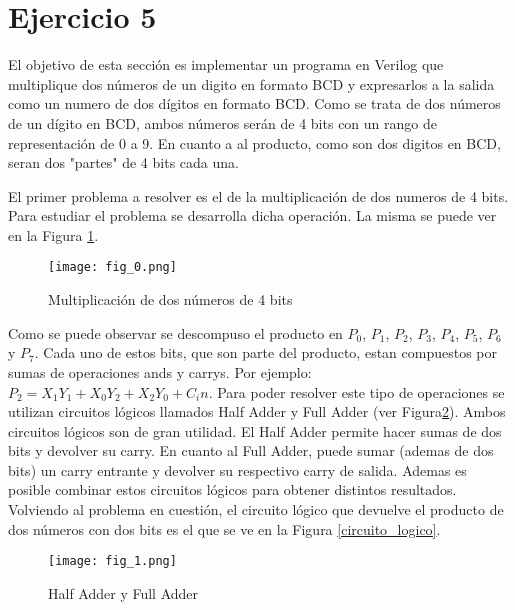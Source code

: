 \documentclass[12pt,a4paper]{article}
\begin{document}
\section{Ejercicio 5}


El objetivo de esta sección es implementar un programa en Verilog que multiplique dos números de un digito en formato BCD y expresarlos a la salida como un numero de dos dígitos en formato BCD. Como se trata
de dos números de un dígito en BCD, ambos números serán de 4 bits con un rango de representación de 0 a 9. En cuanto a al producto, como son dos digitos en BCD, seran dos "partes" de 4 bits cada una. 

El primer problema a resolver es el de la multiplicación de dos numeros de 4 bits. Para estudiar el problema se desarrolla dicha operación. La misma se puede ver en la Figura \ref{multiplicacion}. 


\begin{figure}[ht]                                                       
    \centering\texttt{[image: fig\_0.png]}
     \caption{Multiplicación de dos números de 4 bits}
     \label{multiplicacion}
     \end{figure}

Como se puede observar se descompuso el producto en $P_0$, $P_1$, $P_2$, $P_3$, $P_4$, $P_5$, $P_6$ y $P_7$. Cada uno de estos bits, que son parte del producto, estan compuestos por sumas de operaciones 
ands y carrys. Por ejemplo: $P_2 = X_1Y_1 + X_0Y_2 + X_2Y_0 + C_in$. Para poder resolver este tipo de operaciones se utilizan circuitos lógicos llamados Half Adder y Full Adder (ver Figura\ref{full_adder}). Ambos circuitos 
lógicos son de gran utilidad. El Half Adder permite hacer sumas de dos bits y devolver su carry. En cuanto al Full Adder, puede sumar (ademas de dos bits) un carry entrante y devolver su respectivo
carry de salida.  Ademas es posible combinar estos circuitos lógicos para obtener distintos resultados.
Volviendo al problema en cuestión, el circuito lógico que devuelve el producto de dos números con dos bits es el que se ve en la Figura \ref{circuito_logico}.


\begin{figure}[h!]                                                       
    \centering\texttt{[image: fig\_1.png]}
     \caption{Half Adder y Full Adder}
     \label{full_adder}
     \end{figure}
\end{document}
